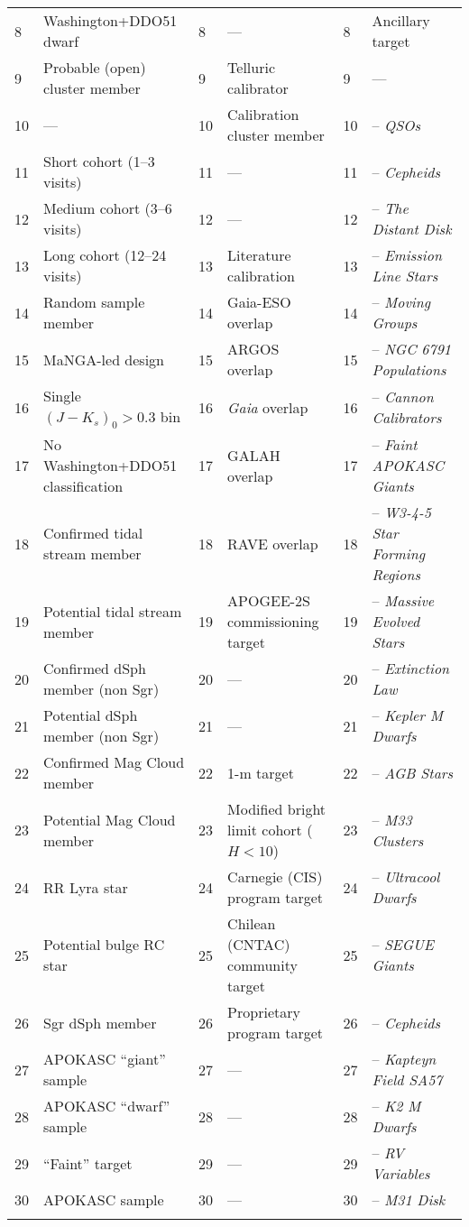 \documentclass[12pt,twocolumn]{emulateapj}
\begin{document}
\begin{table*}[!ht]
\begin{center}
\begin{tabular}{llllll}
8 & Washington+DDO51 dwarf & 8 & --- & 8 & Ancillary target \\
9 & Probable (open) cluster member & 9 & Telluric calibrator & 9 & --- \\
10 & --- & 10 & Calibration cluster member & 10 & -- {\it QSOs} \\
11 & Short cohort (1--3 visits) & 11 & --- & 11 & -- {\it Cepheids} \\
12 & Medium cohort (3--6 visits) & 12 & --- & 12 & -- {\it The Distant Disk} \\
13 & Long cohort (12--24 visits) & 13 & Literature calibration & 13 & -- {\it Emission Line Stars}\\
14 & Random sample member & 14 & Gaia-ESO overlap & 14 & -- {\it Moving Groups} \\
15 & MaNGA-led design & 15 & ARGOS overlap & 15 & -- {\it NGC 6791 Populations} \\
16 & Single $(J-K_s)_0 > 0.3$ bin & 16 & {\it Gaia} overlap & 16 & -- {\it Cannon Calibrators} \\
17 & No Washington+DDO51 classification & 17 & GALAH overlap & 17 & -- {\it Faint APOKASC Giants}\\
18 & Confirmed tidal stream member & 18 & RAVE overlap & 18 & -- {\it W3-4-5 Star Forming Regions}\\
19 & Potential tidal stream member & 19 & APOGEE-2S commissioning target & 19 & -- {\it Massive Evolved Stars} \\
20 & Confirmed dSph member (non Sgr) & 20 & --- & 20 & -- {\it Extinction Law} \\
21 & Potential dSph member (non Sgr) & 21 & --- & 21 & -- {\it Kepler M Dwarfs} \\
22 & Confirmed Mag Cloud member & 22 & 1-m target & 22 & -- {\it AGB Stars} \\
23 & Potential Mag Cloud member & 23 & Modified bright limit cohort ($H<10$) & 23 & -- {\it M33 Clusters} \\
24 & RR Lyra star & 24 & Carnegie (CIS) program target & 24 & -- {\it Ultracool Dwarfs} \\
25 & Potential bulge RC star & 25 & Chilean (CNTAC) community target & 25 & -- {\it SEGUE Giants} \\
26 & Sgr dSph member & 26 & Proprietary program target & 26 & -- {\it Cepheids} \\
27 & APOKASC ``giant'' sample & 27 & --- & 27 & -- {\it Kapteyn Field SA57} \\
28 & APOKASC ``dwarf'' sample & 28 & --- & 28 & -- {\it K2 M Dwarfs} \\
29 & ``Faint'' target & 29 & --- & 29 & -- {\it RV Variables} \\
30 & APOKASC sample & 30 & --- & 30 & -- {\it M31 Disk} \\
\hline \\
\end{tabular}
\end{center}
\label{tab:targeting_bits}
\end{table*}
\end{document}
